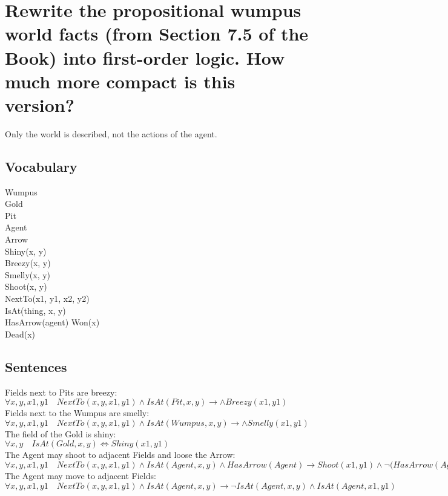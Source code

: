 \documentclass{scrartcl}
\begin{document}
\section{Rewrite the propositional wumpus world facts (from Section 7.5 of the Book) into first-order logic. How much more compact is this version?}
Only the world is described, not the actions of the agent.
\subsection{Vocabulary}
Wumpus\\
Gold\\
Pit\\
Agent\\
Arrow\\
Shiny(x, y)\\
Breezy(x, y)\\
Smelly(x, y)\\
Shoot(x, y)\\
NextTo(x1, y1, x2, y2)\\
IsAt(thing, x, y)\\
HasArrow(agent)
Won(x)\\
Dead(x)\\
\subsection{Sentences}

Fields next to Pits are breezy:\\
$\forall x, y, x1, y1 \quad NextTo(x, y, x1, y1) \land IsAt(Pit, x, y) \to  \land Breezy(x1, y1)$\\

Fields next to the Wumpus are smelly:\\
$\forall x, y, x1, y1 \quad NextTo(x, y, x1, y1) \land IsAt(Wumpus, x, y) \to  \land Smelly(x1, y1)$\\

The field of the Gold is shiny:\\
$\forall x, y \quad IsAt(Gold, x, y) \iff  Shiny(x1, y1)$\\

The Agent may shoot to adjacent Fields and loose the Arrow:\\
$\forall x, y, x1, y1 \quad NextTo(x, y, x1, y1) \land IsAt(Agent, x, y) \land HasArrow(Agent) \to  Shoot(x1, y1) \land \neg(HasArrow(Agent)$\\

The Agent may move to adjacent Fields:\\
$\forall x, y, x1, y1 \quad NextTo(x, y, x1, y1) \land IsAt(Agent, x, y)  \to  \neg IsAt(Agent, x, y) \land IsAt(Agent, x1, y1)$\\
\end{document}

